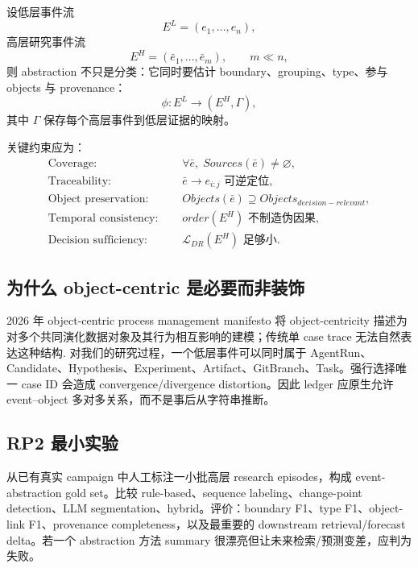 \documentclass[11pt,a4paper]{ctexart}
\begin{document}
设低层事件流
\begin{equation}
E^L=(e_1,\ldots,e_n),
\end{equation}
高层研究事件流
\begin{equation}
E^H=(\bar e_1,\ldots,\bar e_m),\qquad m\ll n,
\end{equation}
则 abstraction 不只是分类：它同时要估计 boundary、grouping、type、参与 objects 与 provenance：
\begin{equation}
\phi:E^L\to (E^H,\Gamma),
\end{equation}
其中 $\Gamma$ 保存每个高层事件到低层证据的映射。

关键约束应为：
\begin{align}
\text{Coverage: }&\quad \forall \bar e,\;Sources(\bar e)\neq\varnothing,\\
\text{Traceability: }&\quad \bar e\to e_{i:j}\text{ 可逆定位},\\
\text{Object preservation: }&\quad Objects(\bar e)\supseteq Objects_{decision-relevant},\\
\text{Temporal consistency: }&\quad order(E^H)\text{ 不制造伪因果},\\
\text{Decision sufficiency: }&\quad \mathcal L_{DR}(E^H)\text{ 足够小}.
\end{align}

\subsection{为什么 object-centric 是必要而非装饰}

2026 年 object-centric process management manifesto 将 object-centricity 描述为对多个共同演化数据对象及其行为相互影响的建模；传统单 case trace 无法自然表达这种结构\parencite{seidel2026ocpm}. 对我们的研究过程，一个低层事件可以同时属于 AgentRun、Candidate、Hypothesis、Experiment、Artifact、GitBranch、Task。强行选择唯一 case ID 会造成 convergence/divergence distortion。因此 ledger 应原生允许 event--object 多对多关系，而不是事后从字符串推断。

\subsection{RP2 最小实验}

从已有真实 campaign 中人工标注一小批高层 research episodes，构成 event-abstraction gold set。比较 rule-based、sequence labeling、change-point detection、LLM segmentation、hybrid。评价：boundary F1、type F1、object-link F1、provenance completeness，以及最重要的 downstream retrieval/forecast delta。若一个 abstraction 方法 summary 很漂亮但让未来检索/预测变差，应判为失败。
\end{document}
